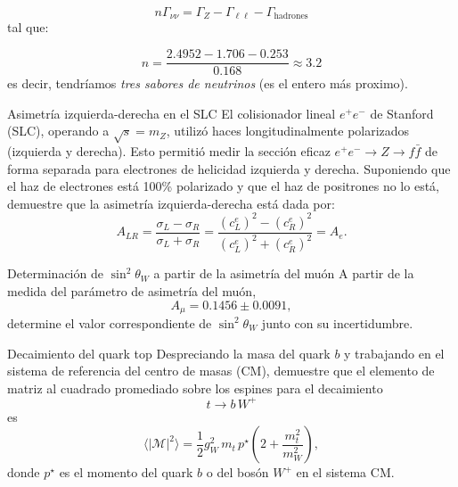 \begin{equation}
	n 	\Gamma_{{\nu \nu}} = \Gamma_Z -\Gamma_{\ell \ell}  - \Gamma_{\text{hadrones}} 
\end{equation}
tal que: 

\begin{equation}
	n = \frac{2.4952-1.706-0.253}{0.168} \approx 3.2 
\end{equation}
es decir, tendríamos \textit{tres sabores de neutrinos} (es el entero más proximo). 


\begin{Ejercicio}{Asimetría izquierda-derecha en el SLC}\label{Ej:20}
El colisionador lineal $e^+e^-$ de Stanford (SLC), operando a $\sqrt{s} = m_Z$, utilizó haces longitudinalmente polarizados (izquierda y derecha). 
Esto permitió medir la sección eficaz $e^+e^- \to Z \to f\bar{f}$ de forma separada para electrones de helicidad izquierda y derecha.
Suponiendo que el haz de electrones está 100\% polarizado y que el haz de positrones no lo está, demuestre que la asimetría izquierda-derecha está dada por:
\[
A_{LR} = \frac{\sigma_L - \sigma_R}{\sigma_L + \sigma_R} 
= \frac{(c_L^e)^2 - (c_R^e)^2}{(c_L^e)^2 + (c_R^e)^2} = A_e.
\]
\end{Ejercicio}




\begin{Ejercicio}{Determinación de $\sin^2\theta_W$ a partir de la asimetría del muón}\label{Ej:21}
A partir de la medida del parámetro de asimetría del muón, 
\[
A_\mu = 0.1456 \pm 0.0091,
\]
determine el valor correspondiente de $\sin^2\theta_W$ junto con su incertidumbre.
\end{Ejercicio}




\begin{Ejercicio}{Decaimiento del quark top}\label{Ej:22}
Despreciando la masa del quark $b$ y trabajando en el sistema de referencia del centro de masas (CM),
demuestre que el elemento de matriz al cuadrado promediado sobre los espines para el decaimiento 
\[
t \to b\, W^+
\]
es
\[
\langle |\mathcal{M}|^2 \rangle 
= \frac{1}{2} g_W^2\, m_t\, p^{\star}
\left( 2 + \frac{m_t^2}{m_W^2} \right),
\]
donde $p^{\star}$ es el momento del quark $b$ o del bosón $W^+$ en el sistema CM.
\end{Ejercicio}


